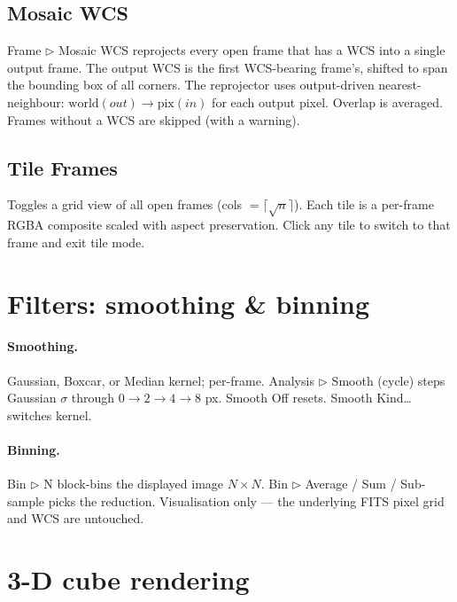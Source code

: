 \documentclass[11pt,a4paper]{article}
\begin{document}
\subsection{Mosaic WCS}\label{sec:mosaic}

\textsf{Frame $\triangleright$ Mosaic WCS} reprojects every open frame
that has a WCS into a single output frame. The output WCS is the first
WCS-bearing frame's, shifted to span the bounding box of all corners.
The reprojector uses output-driven nearest-neighbour:
$\text{world}(out) \to \text{pix}(in)$ for each output pixel. Overlap is
averaged. Frames without a WCS are skipped (with a warning).

\subsection{Tile Frames}

Toggles a grid view of all open frames (cols $= \lceil\sqrt{n}\rceil$).
Each tile is a per-frame RGBA composite scaled with aspect preservation.
Click any tile to switch to that frame and exit tile mode.

\section{Filters: smoothing \& binning}

\paragraph{Smoothing.} Gaussian, Boxcar, or Median kernel; per-frame.
\textsf{Analysis $\triangleright$ Smooth (cycle)} steps Gaussian
$\sigma$ through $0 \to 2 \to 4 \to 8$ px. \textsf{Smooth Off} resets.
\textsf{Smooth Kind\dots} switches kernel.

\paragraph{Binning.} \textsf{Bin $\triangleright$ N} block-bins the
displayed image $N \times N$. \textsf{Bin $\triangleright$
Average / Sum / Sub-sample} picks the reduction. Visualisation only --- the
underlying FITS pixel grid and WCS are untouched.

\section{3-D cube rendering}
\end{document}
